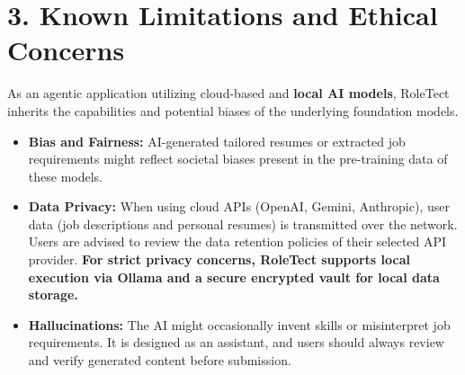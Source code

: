 \documentclass[11pt, a4paper]{article}
\begin{document}
\section*{3. Known Limitations and Ethical Concerns}
As an agentic application utilizing cloud-based and \textbf{local AI models}, RoleTect inherits the capabilities and potential biases of the underlying foundation models.
\begin{itemize}
    \item \textbf{Bias and Fairness:} AI-generated tailored resumes or extracted job requirements might reflect societal biases present in the pre-training data of these models.
    \item \textbf{Data Privacy:} When using cloud APIs (OpenAI, Gemini, Anthropic), user data (job descriptions and personal resumes) is transmitted over the network. Users are advised to review the data retention policies of their selected API provider. \textbf{For strict privacy concerns, RoleTect supports local execution via Ollama and a secure encrypted vault for local data storage.}
    \item \textbf{Hallucinations:} The AI might occasionally invent skills or misinterpret job requirements. It is designed as an assistant, and users should always review and verify generated content before submission.
\end{itemize}
\end{document}
